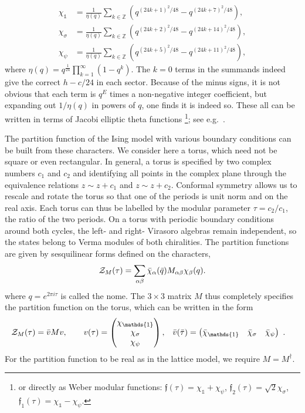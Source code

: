 \documentclass[11pt]{article}
\numberwithin{equation}{section}		%
\begin{document}
\begin{subequations}\begin{align}
	\chi_{\mathds{1}} &= \frac{1}{\eta(q)} \sum_{k \in \mathbb{Z}}\left( q^{(24k+1)^2/48}-q^{(24k+7)^2/48} \right) ,\\
	\chi_{\sigma} &= \frac{1}{\eta(q)} \sum_{k \in \mathbb{Z}}\left( q^{(24k+2)^2/48}-q^{(24k+14)^2/48} \right) ,\\
	\chi_{\psi} &=  \frac{1}{\eta(q)} \sum_{k \in \mathbb{Z}} \left(q^{(24k+5)^2/48}-q^{(24k+11)^2/48}\right) ,
\end{align}\end{subequations}
where $ \eta(q) = q^{\frac{1}{24}} \prod_{k = 1}^{\infty} (1 - q^k)$.
The $k=0$ terms in the summands indeed give the correct $h-c/24$ in each sector.
Because of the minus signs, it is not obvious that each term is $q^E$ times a non-negative integer coefficient, but expanding out $1/\eta(q)$ in powers of $q$, one finds it is indeed so. These all can be written in terms of Jacobi elliptic theta functions%
	\footnote{or directly as Weber modular functions: $\mathfrak{f}(\tau) = \chi_{\mathds{1}}+\chi_\psi$, $\mathfrak{f}_2(\tau) = \sqrt{2}\chi_\sigma$, $\mathfrak{f}_1(\tau) = \chi_{\mathds{1}}-\chi_\psi$.}; see e.g.~\cite{Ginsparg}.


The partition function of the Ising model with various boundary conditions can be built from these characters. We consider here a torus, which need not be square or even rectangular. In general, a torus is specified by two complex numbers $c_1$ and $c_2$ and identifying all points in the complex plane through the equivalence relations $z \sim z+ c_1$ and $z \sim z +c_2 $. Conformal symmetry allows us to rescale and rotate the torus so that one of the periods is unit norm and on the real axis. Each torus can thus be labelled by the modular parameter $\tau =c_2/ c_1$, the ratio of the two periods. 
On a torus with periodic boundary conditions around both cycles,  the left- and right- Virasoro algebras remain independent, so the states belong to Verma modules of both chiralities. 
The partition functions are given by sesquilinear forms defined on the characters, 
\begin{align}
	{\cal Z}_{M}(\tau) = \sum_{\alpha \beta}\bar{ \chi}_\alpha(\bar{q}) M_{\alpha \beta} \chi_{\beta}(q).
\label{ZM}
\end{align}
where $q = e^{2 \pi i \tau}$ is called the nome.
The $3\times3$ matrix $M$ thus completely specifies the partition function on the torus, which can be written in the form
\begin{align}
{\cal Z}_{M}(\tau) =\bar{v} Mv,\qquad v(\tau) &= \begin{pmatrix} \chi_{\mathds{1}} \\ \chi_\sigma \\ \chi_\psi \end{pmatrix} ,
&	\bar{v}(\bar{\tau}) &= \begin{pmatrix} \bar\chi_{\mathds{1}} & \bar\chi_\sigma & \bar\chi_\psi \end{pmatrix}\ .
\end{align}
For the partition function to be real as in the lattice model, we require $M=M^\dagger$. 
\end{document}
